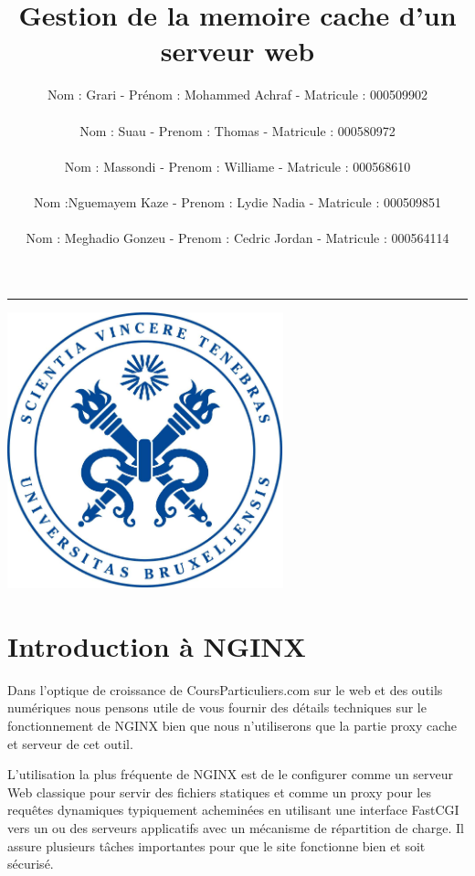 \documentclass{article}
\title{Gestion de la memoire cache d'un serveur web}
\author{Nom : Grari \hspace{0.25cm} - \hspace{0.25cm} Prénom : Mohammed Achraf\hspace{0.25cm}  - \hspace{0.25cm} Matricule : 000509902\\\\Nom : Suau\hspace{0.25cm} -\hspace{0.25cm} Prenom : Thomas \hspace{0.25cm}-\hspace{0.25cm} Matricule : 000580972\\\\Nom : Massondi\hspace{0.25cm} -\hspace{0.25cm} Prenom : Williame \hspace{0.25cm}-\hspace{0.25cm} Matricule : 000568610\\\\Nom :Nguemayem Kaze\hspace{0.25cm} -\hspace{0.25cm} Prenom : Lydie Nadia \hspace{0.25cm}-\hspace{0.25cm} Matricule : 000509851 \\\\Nom : Meghadio Gonzeu\hspace{0.25cm} -\hspace{0.25cm} Prenom : Cedric Jordan  \hspace{0.25cm}-\hspace{0.25cm} Matricule : 000564114}
\date{}
\begin{document}
\maketitle\hrule

  \begin{center}
  \vspace{1.5 cm}
    \includegraphics[width=0.6\textwidth]{logo.png}
    \captionsetup{labelformat=empty}
    \label{fig:0}
  \end{center}
  
\newpage
\tableofcontents
\newpage


\section{Introduction à NGINX}

Dans l'optique de croissance de CoursParticuliers.com sur le web et des outils numériques nous pensons utile de vous fournir des détails techniques sur le fonctionnement de NGINX bien que nous n'utiliserons que la partie proxy cache et serveur de cet outil.

L'utilisation la plus fréquente de NGINX est de le configurer comme un serveur Web classique pour servir des fichiers statiques et comme un proxy pour les requêtes dynamiques typiquement acheminées en utilisant une interface FastCGI vers un ou des serveurs applicatifs avec un mécanisme de répartition de charge.
Il assure plusieurs tâches importantes pour que le site fonctionne bien et soit sécurisé.\\
\end{document}
